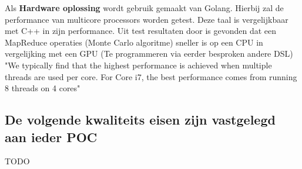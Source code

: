 Als \textbf{Hardware oplossing} wordt gebruik gemaakt van Golang. Hierbij zal de performance van multicore processors worden getest. Deze taal is vergelijkbaar met C++ in zijn performance. Uit test resultaten door \cite{lee2010debunking} is gevonden dat een MapReduce operaties (Monte Carlo algoritme) sneller is op een CPU in vergelijking met een GPU (Te programmeren via eerder besproken andere DSL) "We typically find that the highest performance is achieved when multiple threads are used per core. For Core i7, the best performance comes from running 8 threads on 4 cores" \parencite{lee2010debunking}

\subsection{De volgende kwaliteits eisen zijn vastgelegd aan ieder POC}

TODO



